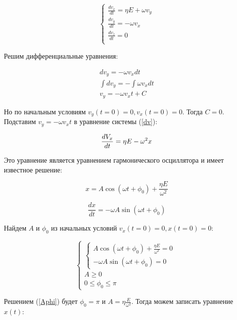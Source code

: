 \begin{equation}
\label{dv}
 \begin{cases}
   \frac{dv_x}{dt}=\eta{}E+\omega{}v_y\\
   \frac{dv_y}{dt}=-\omega{}v_x\\
   \frac{dv_z}{dt}=0\\
 \end{cases}
\end{equation}

Решим дифференциальные уравнения:

\begin{gather}
	\label{diff}
	 dv_y=-\omega{}v_x{}dt\\
	 \int dv_y=-\int\omega{}v_x{}dt\\
	 v_y=-\omega{}v_x{}t+C
\end{gather}

Но по начальным условиям $v_y(t=0)=0,v_x(t=0)=0$. Тогда $C=0$. Подставим $v_y=-\omega{}v_x{}t$ в уравнение системы (\ref{dv}):

\begin{equation}
	\frac{dV_x}{dt}=\eta{}E-\omega^2{}x\\
\end{equation}

Это уравнение является уравнением гармонического осциллятора и имеет известное решение:

\begin{equation}
	x=A\cos{(\omega{t}+\phi_0)}+\frac{\eta{E}}{\omega^2}
\end{equation}

\begin{equation}
	\frac{dx}{dt}=-\omega{A}\sin{(\omega{t}+\phi_0)}
\end{equation}

Найдем $A$ и $\phi_0$ из начальных условий $v_x(t=0)=0, x(t=0)=0$:

\begin{equation}
\label{Aphi}
 \begin{cases}
    \begin{cases}
   		A\cos{(\omega{t}+\phi_0)}+\frac{\eta{E}}{\omega^2}=0\\
   		-\omega{A}\sin{(\omega{t}+\phi_0)}=0
 	\end{cases}\\
 	A\geq0\\
 	0\leq\phi_0\leq\pi
 \end{cases}
\end{equation}

Решением (\ref{Aphi}) будет $\phi_0=\pi$ и $A=\eta\frac{E}{\omega^2}$. Тогда можем записать уравнение $x(t)$:

